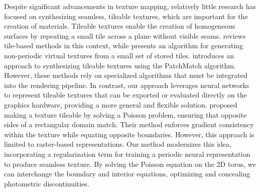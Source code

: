 Despite significant advancements in texture mapping, relatively little research has focused on synthesizing seamless, tileable textures, which are important for the creation of materials. Tileable textures enable the creation of homogeneous surfaces by repeating a small tile across a plane without visible seams. \citet{tileinteractive} reviews tile-based methods in this context, while \citet{tilehard} presents an algorithm for generating non-periodic virtual textures from a small set of stored tiles. \citet{Moritz2017Texture} introduces an approach to synthesizing tileable textures using the PatchMatch algorithm. However, these methods rely on specialized algorithms that must be integrated into the rendering pipeline. In contrast, our approach leverages neural networks to represent tileable textures that can be exported or evaluated directly on the graphics hardware, providing a more general and flexible solution.
%
\citet{perez2003} proposed making a texture tileable by solving a Poisson problem, ensuring that opposite sides of a rectangular domain match. Their method enforces gradient consistency within the texture while equating opposite boundaries. However, this approach is limited to raster-based representations. Our method modernizes this idea, incorporating a regularization term for training a periodic neural representation to produce seamless texture. By solving the Poisson equation on the 2D torus, we can interchange the boundary and interior equations, optimizing and concealing photometric discontinuities.




